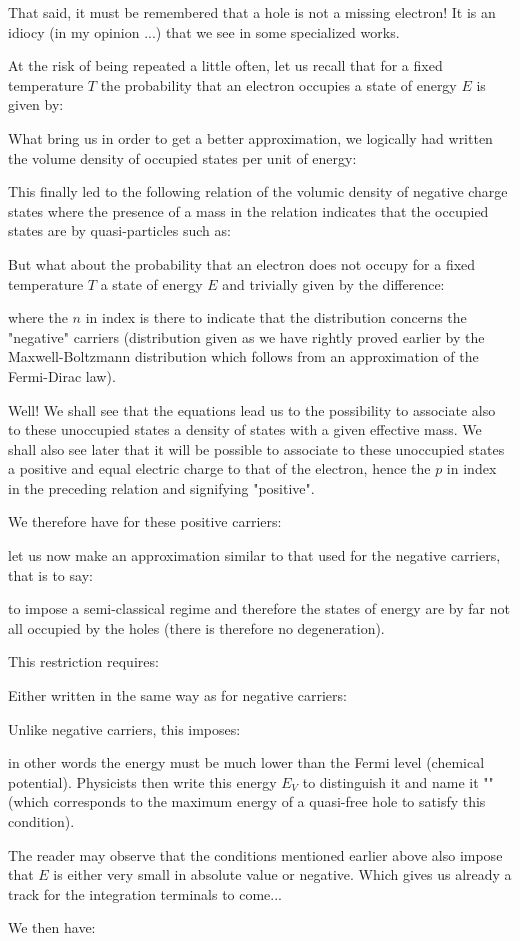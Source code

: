 	That said, it must be remembered that a hole is not a missing electron! It is an idiocy (in my opinion ...) that we see in some specialized works.

	At the risk of being repeated a little often, let us recall that for a fixed temperature $T$ the probability that an electron occupies a state of energy $E$ is given by:
	
	What bring us in order to get a better approximation, we logically had written the volume density of occupied states per unit of energy:
	
	This finally led to the following relation of the volumic density of negative charge states where the presence of a mass in the relation indicates that the occupied states are by quasi-particles such as:
	
	But what about the probability that an electron does not occupy for a fixed temperature $T$ a state of energy $E$ and trivially given by the difference:
	
	where the $n$ in index is there to indicate that the distribution concerns the "negative" carriers (distribution given as we have rightly proved earlier by the Maxwell-Boltzmann distribution which follows from an approximation of the Fermi-Dirac law).
	
	Well! We shall see that the equations lead us to the possibility to associate also to these unoccupied states a density of states with a given effective mass. We shall also see later that it will be possible to associate to these unoccupied states a positive and equal electric charge to that of the electron, hence the $p$ in index in the preceding relation and signifying "positive".

	We therefore have for these positive carriers:
	
	let us now make an approximation similar to that used for the negative carriers, that is to say:
	
	to impose a semi-classical regime and therefore the states of energy are by far not all occupied by the holes (there is therefore no degeneration).

	This restriction requires:
	
	Either written in the same way as for negative carriers:
	
	Unlike negative carriers, this imposes:
	
	in other words the energy must be much lower than the Fermi level (chemical potential). Physicists then write this energy $E_V$ to distinguish it and name it "" (which corresponds to the maximum energy of a quasi-free hole to satisfy this condition).
	\begin{tcolorbox}[title=Remark,colframe=black,arc=10pt]
	The reader may observe that the conditions mentioned earlier above also impose that $E$ is either very small in absolute value or negative. Which gives us already a track for the integration terminals to come...
	\end{tcolorbox}	
	We then have:
	
